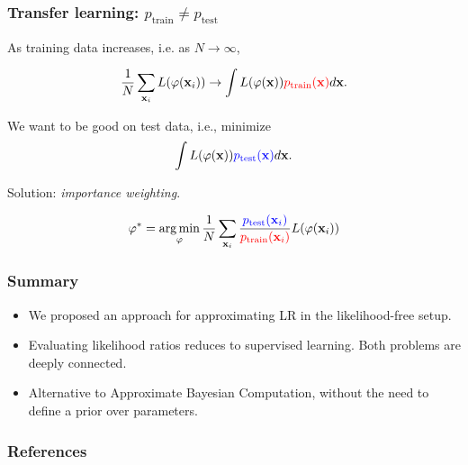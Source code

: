 \documentclass{beamer}
\DeclareMathOperator*{\argmin}{arg\,min}
\begin{document}
\begin{frame}
    \frametitle{Transfer learning: $p_\text{train} \neq p_\text{test}$}

    As training data increases, i.e. as $N \to \infty$,

    $$\frac{1}{N} \sum_{\mathbf{x}_i} L(\varphi(\mathbf{x}_i)) \to \int L(\varphi(\mathbf{x})) {\color{red} p_\text{train}(\mathbf{x})} d\mathbf{x}.$$

    We want to be good on test data, i.e., minimize
    $$\int L(\varphi(\mathbf{x})) {\color{blue} p_\text{test}(\mathbf{x})} d\mathbf{x}.$$

    Solution: {\it importance weighting}.

    $$\varphi^* = \argmin_\varphi \frac{1}{N} \sum_{\mathbf{x}_i} \frac{\color{blue} p_\text{test}(\mathbf{x}_i)}{\color{red} p_\text{train}(\mathbf{x}_i)}  L(\varphi(\mathbf{x}_i))$$
\end{frame}


\begin{frame}
    \frametitle{Summary}

    \begin{itemize}
        \item We proposed an approach for approximating LR in the likelihood-free setup.

        \item Evaluating likelihood ratios reduces to supervised learning. Both problems are deeply connected.

        \item Alternative to Approximate Bayesian Computation, without the need to define a prior over parameters.
    \end{itemize}
\end{frame}

\begin{frame}
    \frametitle{References}
    {\footnotesize
    
    }
\end{frame}
\end{document}

